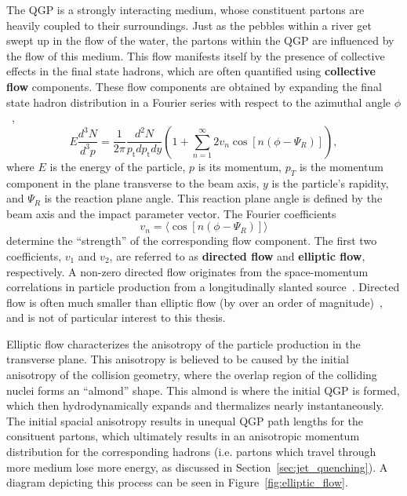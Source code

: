 The QGP is a strongly interacting medium, whose constituent partons are heavily coupled to their surroundings. Just as the pebbles within a river get swept up in the flow of the water, the partons within the QGP are influenced by the flow of this medium. This flow manifests itself by the presence of collective effects in the final state hadrons, which are often quantified using \textbf{collective flow} components. These flow components are obtained by expanding the final state hadron distribution in a Fourier series with respect to the azimuthal angle $\phi$~\cite{Flow24},
%
\begin{equation}
    \label{eq:flow_fourier}
    E \frac{d^3 N}{d^3 p}=\frac{1}{2 \pi} \frac{d^2 N}{p_{\mathrm{t}} d p_{\mathrm{t}} d y}\left(1+\sum_{n=1}^{\infty} 2 v_n \cos \left[n\left(\phi-\Psi_R\right)\right]\right),
\end{equation}
where $E$ is the energy of the particle, $p$ is its momentum, $p_T$ is the momentum component in the plane transverse to the beam axis, $y$ is the particle's rapidity, and $\Psi_R$ is the reaction plane angle. This reaction plane angle is defined by the beam axis and the impact parameter vector. The Fourier coefficients
\begin{equation}
    v_n = \langle \cos[n(\phi - \Psi_R)] \rangle
\end{equation}
determine the ``strength'' of the corresponding flow component. The first two coefficients, $v_1$ and $v_2$, are referred to as \textbf{directed flow} and \textbf{elliptic flow}, respectively. A non-zero directed flow originates from the space-momentum correlations in particle production from a longitudinally slanted source~\cite{DirectedFlow}. Directed flow is often much smaller than elliptic flow (by over an order of magnitude)~\cite{DirectedFlow2}, and is not of particular interest to this thesis. 

Elliptic flow characterizes the anisotropy of the particle production in the transverse plane. This anisotropy is believed to be caused by the initial anisotropy of the collision geometry, where the overlap region of the colliding nuclei forms an ``almond'' shape. This almond is where the initial QGP is formed, which then hydrodynamically expands and thermalizes nearly instantaneously. The initial spacial anisotropy results in unequal QGP path lengths for the consituent partons, which ultimately results in an anisotropic momentum distribution for the corresponding hadrons (i.e. partons which travel through more medium lose more energy, as discussed in Section~\ref{sec:jet_quenching}). A diagram depicting this process can be seen in Figure~\ref{fig:elliptic_flow}.

